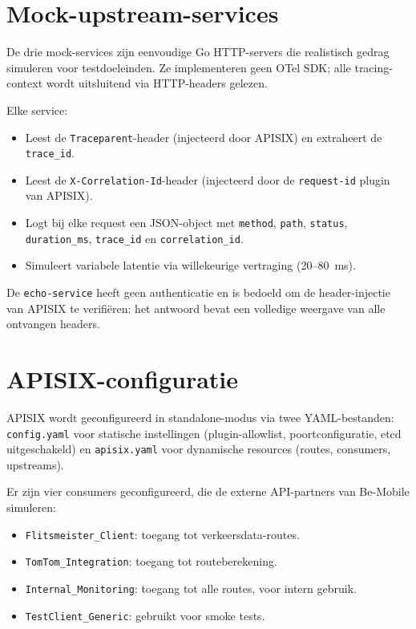 \section{Mock-upstream-services}%
\label{sec:mock-services}

De drie mock-services zijn eenvoudige Go HTTP-servers die realistisch gedrag simuleren voor testdoeleinden. Ze implementeren geen OTel SDK; alle tracing-context wordt uitsluitend via HTTP-headers gelezen.

Elke service:
\begin{itemize}
  \item Leest de \texttt{Traceparent}-header (injecteerd door APISIX) en extraheert de \texttt{trace\_id}.
  \item Leest de \texttt{X-Correlation-Id}-header (injecteerd door de \texttt{request-id} plugin van APISIX).
  \item Logt bij elke request een JSON-object met \texttt{method}, \texttt{path}, \texttt{status}, \texttt{duration\_ms}, \texttt{trace\_id} en \texttt{correlation\_id}.
  \item Simuleert variabele latentie via willekeurige vertraging (20--80~ms).
\end{itemize}

De \texttt{echo-service} heeft geen authenticatie en is bedoeld om de header-injectie van APISIX te verifiëren: het antwoord bevat een volledige weergave van alle ontvangen headers.

\section{APISIX-configuratie}%
\label{sec:apisix-config}

APISIX wordt geconfigureerd in standalone-modus via twee YAML-bestanden: \texttt{config.yaml} voor statische instellingen (plugin-allowlist, poortconfiguratie, etcd uitgeschakeld) en \texttt{apisix.yaml} voor dynamische resources (routes, consumers, upstreams).

Er zijn vier consumers geconfigureerd, die de externe API-partners van Be-Mobile simuleren:

\begin{itemize}
  \item \texttt{Flitsmeister\_Client}: toegang tot verkeersdata-routes.
  \item \texttt{TomTom\_Integration}: toegang tot routeberekening.
  \item \texttt{Internal\_Monitoring}: toegang tot alle routes, voor intern gebruik.
  \item \texttt{TestClient\_Generic}: gebruikt voor smoke tests.
\end{itemize}

